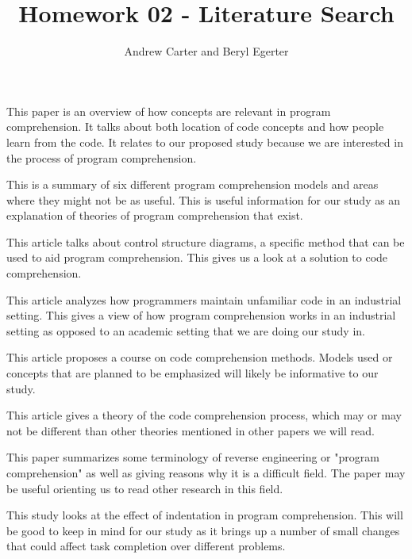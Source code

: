 \documentclass{article}
\title{Homework 02 - Literature Search}
\author{Andrew Carter and Beryl Egerter}
\begin{document}
\maketitle

This paper is an overview of how concepts are relevant in program comprehension. It talks about both location of code concepts and how people learn from the code. It relates to our proposed study because we are interested in the process of program comprehension. \cite{1021348}

This is a summary of six different program comprehension models and areas where they might not be as useful. This is useful information for our study as an explanation of theories of program comprehension that exist. \cite{402076}

This article talks about control structure diagrams, a specific method that can be used to aid program comprehension. This gives us a look at a solution to code comprehension. \cite{1000450}

This article analyzes how programmers maintain unfamiliar code in an industrial setting. This gives a view of how program comprehension works in an industrial setting as opposed to an academic setting that we are doing our study in. \cite{469502}

This article proposes a course on code comprehension methods. Models used or concepts that are planned to be emphasized will likely be informative to our study. \cite{1562886}

This article gives a theory of the code comprehension process, which may or may not be different than other theories mentioned in other papers we will read. \cite{Brooks1983543}

This paper summarizes some terminology of reverse engineering or "program comprehension" as well as giving reasons why it is a difficult field. The paper may be useful orienting us to read other research in this field. \cite{DBLP:journals/corr/abs-cs-0503068}

This study looks at the effect of indentation in program comprehension. This will be good to keep in mind for our study as it brings up a number of small changes that could affect task completion over different problems. \cite{Miara:1983:PIC:182.358437}


\end{document}
